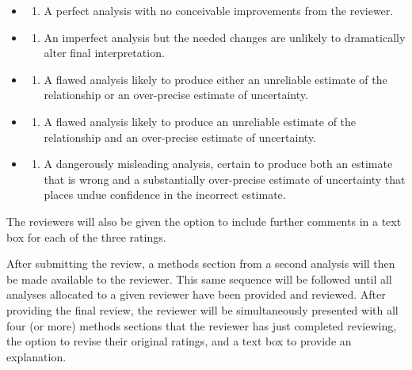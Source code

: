 \documentclass[
  12pt,
]{article}
\providecommand{\tightlist}{%
  \setlength{\itemsep}{0pt}\setlength{\parskip}{0pt}}
\begin{document}
\begin{itemize}
\item
  \begin{enumerate}
  \def\labelenumi{\arabic{enumi}.}
  \setcounter{enumi}{99}
  \tightlist
  \item
    A perfect analysis with no conceivable improvements from the reviewer.
  \end{enumerate}
\item
  \begin{enumerate}
  \def\labelenumi{\arabic{enumi}.}
  \setcounter{enumi}{74}
  \tightlist
  \item
    An imperfect analysis but the needed changes are unlikely to dramatically alter final interpretation.
  \end{enumerate}
\item
  \begin{enumerate}
  \def\labelenumi{\arabic{enumi}.}
  \setcounter{enumi}{49}
  \tightlist
  \item
    A flawed analysis likely to produce either an unreliable estimate of the relationship or an over-precise estimate of uncertainty.
  \end{enumerate}
\item
  \begin{enumerate}
  \def\labelenumi{\arabic{enumi}.}
  \setcounter{enumi}{24}
  \tightlist
  \item
    A flawed analysis likely to produce an unreliable estimate of the relationship and an over-precise estimate of uncertainty.
  \end{enumerate}
\item
  \begin{enumerate}
  \def\labelenumi{\arabic{enumi}.}
  \setcounter{enumi}{-1}
  \tightlist
  \item
    A dangerously misleading analysis, certain to produce both an estimate that is wrong and a substantially over-precise estimate of uncertainty that places undue confidence in the incorrect estimate.
  \end{enumerate}
\end{itemize}

The reviewers will also be given the option to include further comments in a text box for each of the three ratings.

After submitting the review, a methods section from a second analysis will then be made available to the reviewer.
This same sequence will be followed until all analyses allocated to a given reviewer have been provided and reviewed.
After providing the final review, the reviewer will be simultaneously presented with all four (or more) methods sections that the reviewer has just completed reviewing, the option to revise their original ratings, and a text box to provide an explanation.
\end{document}
